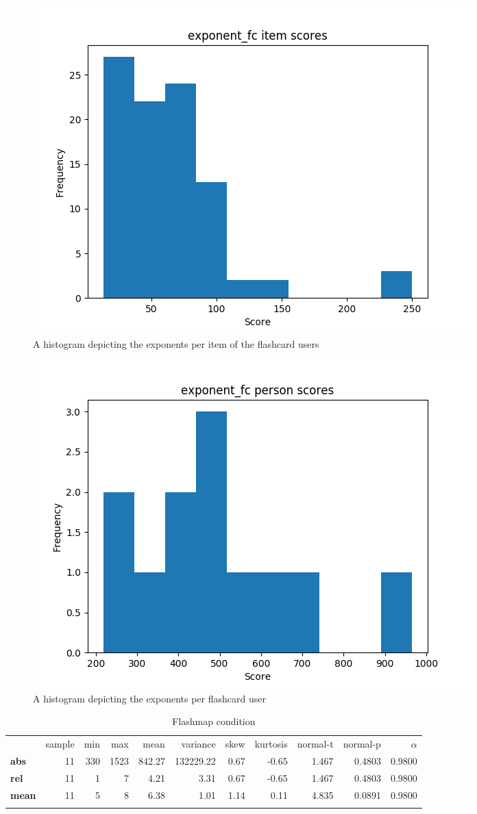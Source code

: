 \begin{figure}
    \centering
    \includegraphics[width=.7\textwidth]{img/exponent_fc_diff.png}
    \caption{A histogram depicting the exponents per item of the flashcard users}
    \label{fig:exponent_fc_diff}
\end{figure}
\begin{figure}
    \centering
    \includegraphics[width=.7\textwidth]{img/exponent_fc_abil.png}
    \caption{A histogram depicting the exponents per flashcard user}
    \label{fig:exponent_fc_abil}
\end{figure}

\begin{longtable}[c]{@{}lrrrrrrrrrr@{}}
    \caption{Flashmap condition}
    \endfirsthead
\toprule\addlinespace
& sample & min & max & mean & variance & skew & kurtosis & normal-t &
normal-p & $\alpha$
\\\addlinespace
\midrule
\textbf{abs} & 11 & 330 & 1523 & 842.27 & 132229.22 & 0.67 & -0.65 &
1.467 & 0.4803 & 0.9800
\\\addlinespace
\textbf{rel} & 11 & 1 & 7 & 4.21 & 3.31 & 0.67 & -0.65 & 1.467 & 0.4803
& 0.9800
\\\addlinespace
\textbf{mean} & 11 & 5 & 8 & 6.38 & 1.01 & 1.14 & 0.11 & 4.835 & 0.0891
& 0.9800
\\\addlinespace
\bottomrule
    \label{tab:exponent_fm}
\end{longtable}

